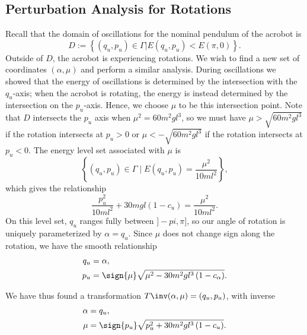 \subsection*{Perturbation Analysis for Rotations}
Recall that the domain of oscillations for the nominal pendulum of the acrobot
is 
\[
    D := \left\{ (q_u,p_u) \in \Gamma | E(q_u,p_u) < E(\pi,0)\right\}
    .
\]
Outside of \(D\), the acrobot is experiencing rotations.
We wish to find a new set of coordinates \((\alpha,\mu)\) and perform a similar
analysis.
During oscillations we showed that the energy of oscillations is determined by
the intersection with the \(q_u\)-axis; 
when the acrobot is rotating, the energy is instead determined by the
intersection on the \(p_u\)-axis.
Hence, we choose \(\mu\) to be this intersection point.
Note that \(D\) intersects the \(p_u\) axis when 
\(\mu^2 = 60m^2 g l^3\), so we must have 
\(\mu > \sqrt{60 m^2 g l^3}\) if the rotation intersects at \(p_u > 0\) 
or \(\mu < -\sqrt{60 m^2 g l^3}\) if the rotation intersects at \(p_u < 0\).
The energy level set associated with \(\mu\) is
\[
    \left\{(q_u,p_u) \in \Gamma \mid E(q_u,p_u) = \frac{\mu^2}{10ml^2}\right\}
    ,
\]
which gives the relationship
\begin{equation}\label{eqn:rotation-pu2}
    \frac{p_u^2}{10m l^2} + 30mgl(1 - c_u) = \frac{\mu^2}{10 ml^2}
    .
\end{equation}
On this level set, \(q_u\) ranges fully between \(]-pi,\pi]\), so our angle of
rotation is uniquely parameterized by \(\alpha = q_u\).
Since \(\mu\) does not change sign along the rotation, we have the smooth
relationship
\begin{align}\label{eqn:rotation-Tinv}
    q_u &= \alpha
    , \\
    p_u &= \sign{\mu}\sqrt{\mu^2 - 30 m^2 g l^3\left(1 - c_\alpha \right)}
    .
\end{align}

We have thus found a transformation \(T\inv(\alpha,\mu) = (q_u,p_u)\), with
inverse 
\begin{align}\label{eqn:rotation-T}
    \alpha &= q_u
    , \\
    \mu &= \sign{p_u}\sqrt{p_u^2 + 30 m^2 g l^3 \left(1 - c_u \right)}
    .
\end{align}

